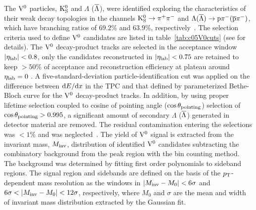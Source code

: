 The ${\rm V}^{0}$ particles, ${\rm K}_{\rm S}^{0}$ and $\Lambda$ ($\overline{\Lambda}$), were identified exploring the characteristics of their weak decay topologies in the channels ${\rm K}_{\rm S}^{0}\to\pi^{+}\pi^{-}$ and $\Lambda(\overline{\Lambda})\to{\rm p}\pi^{-}(\rm\overline{p}\pi^{-})$, which have branching ratios of $69.2\%$ and $63.9\%$, respectively~\cite{Agashe:2014kda}.
The selection criteria used to define ${\rm V}^{0}$ candidates are listed in table~\ref{tab:c05V0cuts} (see \cite{Aamodt:2011zza} for details).
The ${\rm V}^{0}$ decay-product tracks are selected in the acceptance window $\left|\eta_{\rm lab}\right|<0.8$, only the candidates reconstructed in $\left|\eta_{\rm lab}\right|<0.75$ are retained to keep $>50\%$ of acceptance and reconstruction efficiency at plateau around $\eta_{\rm lab}=0$ .
A five-standard-deviation particle-identification cut was applied on the difference between ${\rm d}E/{\rm d}x$ in the TPC and that defined by parameterized Bethe-Bloch curve for the ${\rm V}^{0}$ decay-product tracks.
In addition, by using proper lifetime selection coupled to cosine of pointing angle ($\cos\theta_{\rm pointing}$) selection of $\cos\theta_{\rm pointing}>0.995$, a significant amount of secondary $\Lambda$ ($\overline{\Lambda}$) generated in detector material are removed.
The residual contamination entering the selections was $<1\%$ and was neglected~\cite{Abelev:2013xaa}.
The yield of ${\rm V}^{0}$ signal is extracted from the invariant mass, $M_{\rm inv}$, distribution of identified ${\rm V}^{0}$ candidates subtracting the combinatory background from the peak region with the bin counting method.
The background was determined by fitting first order polynomials to sideband regions.
The signal region and sidebands are defined on the basis of the $\pT$-dependent mass resolution as the windows in $\left|M_{\rm inv}-M_{0}\right|<6\sigma$ and $6\sigma<\left|M_{\rm inv}-M_{0}\right|<12\sigma$, respectively, where $M_{0}$ and $\sigma$ are the mean and width of invariant mass distribution extracted by the Gaussian fit.

